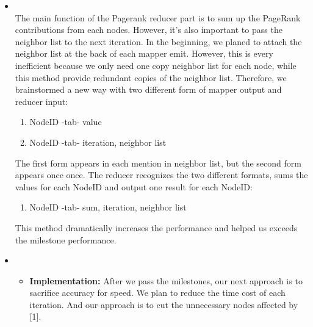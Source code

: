\begin{itemize}
    \item {}\\
    The main function of the Pagerank reducer part is to sum up the PageRank contributions from each nodes. However, it's also important to pass the neighbor list to the next iteration. In the beginning, we planed to attach the neighbor list at the back of each mapper emit. However, this is every inefficient because we only need one copy neighbor list for each node, while this method provide redundant copies of the neighbor list. Therefore, we brainstormed a new way with two different form of mapper output and reducer input:
    \begin{enumerate}
        \item NodeID -tab- value
        \item NodeID -tab- iteration, neighbor list
    \end{enumerate}
    The first form appears in each mention in neighbor list, but the second form appears once once. The reducer recognizes the two different formats, sums the values for each NodeID and output one result for each NodeID:
    \begin{enumerate}
        \item NodeID -tab- sum, iteration, neighbor list
    \end{enumerate}
    This method dramatically increases the performance and helped us exceeds the milestone performance.
    
    
    \item {}\\
    \begin{itemize}
        \item \textbf{Implementation: }  After we pass the milestones, our next approach is to sacrifice accuracy for speed. We plan to reduce the time cost of each iteration. And our approach is to cut the unnecessary nodes affected by [1].\\
        

\end{itemize}
\end{itemize}
